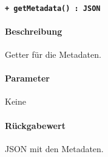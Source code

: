\paragraph{\texttt{+ getMetadata() : JSON}}\label{AP_ChangeAction_getMetadata}%
\paragraph*{Beschreibung}
Getter für die Metadaten.
\paragraph*{Parameter}
Keine
\paragraph*{Rückgabewert}
JSON mit den Metadaten.